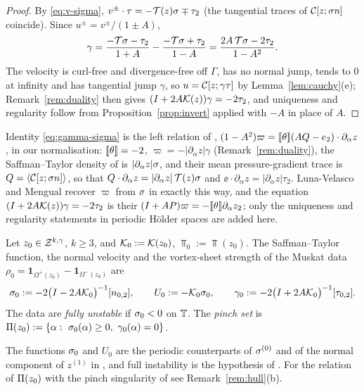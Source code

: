 \begin{proof}
By \eqref{eq:v-sigma}, $v^\pm\cdot\tau=-\mathcal{T}(z)\sigma\mp\tau_2$ (the tangential traces of $\mathcal{C}[z;\sigma n]$ coincide). Since $u^\pm=v^\pm/(1\pm A)$,
\[
\gamma=\frac{-\mathcal{T}\sigma-\tau_2}{1+A}-\frac{-\mathcal{T}\sigma+\tau_2}{1-A}=\frac{2A\,\mathcal{T}\sigma-2\tau_2}{1-A^2}.
\]
The velocity is curl-free and divergence-free off $\Gamma$, has no normal jump, tends to $0$ at infinity and has tangential jump $\gamma$, so $u=\mathcal{C}[z;\gamma\tau]$ by Lemma~\ref{lem:cauchy}(e);
Remark~\ref{rem:duality} then gives $(I+2A\mathcal{K}(z))\gamma=-2\tau_2$, and uniqueness and regularity follow from Proposition~\ref{prop:invert} applied with $-A$ in place of $A$.
\end{proof}

Identity \eqref{eq:gamma-sigma} is the left relation of \cite[(3.7b)]{LM26}, $(1-A^2)\varpi=[\![\theta]\!](AQ-e_2)\cdot\partial_\alpha z$, in our normalisation: $[\![\theta]\!]=-2$,
$\varpi=-|\partial_\alpha z|\gamma$ (Remark~\ref{rem:duality}), the Saffman--Taylor density of \cite{LM26} is $|\partial_\alpha z|\sigma$, and their mean pressure-gradient trace is
$Q=\langle \mathcal{C}[z;\sigma n]\rangle$, so that $Q\cdot\partial_\alpha z=|\partial_\alpha z|\,\mathcal{T}(z)\sigma$ and $\ee\cdot\partial_\alpha z=|\partial_\alpha z|\tau_2$. Luna-Velasco and Mengual \cite[Sec.~3.1.3]{LM26}
recover $\varpi$ from $\sigma$ in exactly this way, and the equation $(I+2A\mathcal{K}(z))\gamma=-2\tau_2$ is their $(I+AP)\varpi=-[\![\theta]\!]\partial_\alpha z_2$; only the uniqueness and regularity
statements in periodic H\"older spaces are added here.

\begin{definition}\label{def:unstable}
Let $z_0\in\mathcal{Z}^{k,\gamma}$, $k\ge3$, and $\mathcal{K}_0:=\mathcal{K}(z_0)$, $\Top_0:=\Top(z_0)$. The Saffman--Taylor function, the normal velocity and the vortex-sheet strength of the Muskat data
$\rho_0=\mathbf 1_{\Omega^+(z_0)}-\mathbf 1_{\Omega^-(z_0)}$ are
\[
\sigma_0:=-2\big(I-2A\mathcal{K}_0\big)^{-1}[n_{0,2}],\qquad U_0:=-\mathcal{K}_0\sigma_0,\qquad \gamma_0:=-2\big(I+2A\mathcal{K}_0\big)^{-1}[\tau_{0,2}] .
\]
The data are \emph{fully unstable} if $\sigma_0<0$ on $\mathbb{T}$. The \emph{pinch set} is $\Pinch(z_0):=\{\alpha:\ \sig_0(\alpha)\ge0,\ \gamma_0(\alpha)=0\}$.
\end{definition}

The functions $\sigma_0$ and $U_0$ are the periodic counterparts of $\sigma^{(0)}$ and of the normal component of $z^{(1)}$ in \cite[(5.12)--(5.13)]{LM26}, and full instability is the
hypothesis of \cite[Thm.~1.1]{LM26}. For the relation of $\Pi(z_0)$ with the pinch singularity of \cite{Men22} see Remark~\ref{rem:hull}(b).

